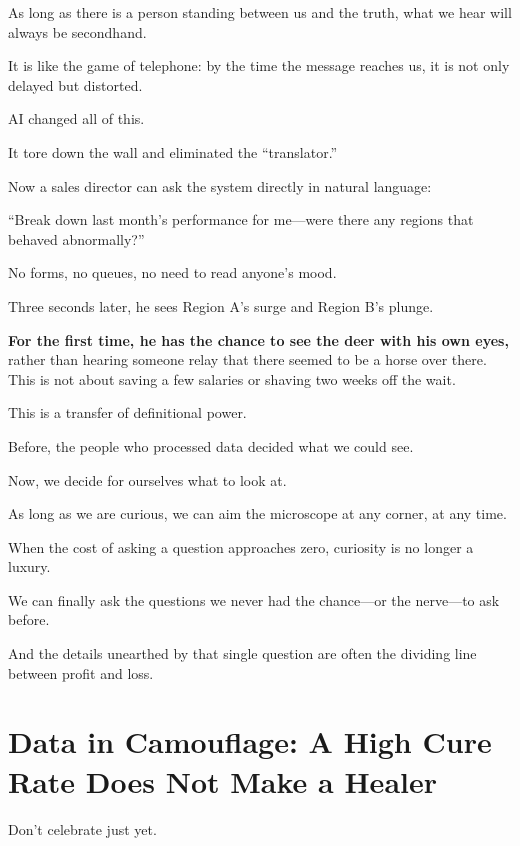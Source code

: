 As long as there is a person standing between us and the truth, what we hear will always be secondhand.

It is like the game of telephone: by the time the message reaches us, it is not only delayed but distorted.

\vspace{1em}

AI changed all of this.

It tore down the wall and eliminated the ``translator.''

Now a sales director can ask the system directly in natural language:

``Break down last month's performance for me---were there any regions that behaved abnormally?''

No forms, no queues, no need to read anyone's mood.

Three seconds later, he sees Region A's surge and Region B's plunge.

\vspace{1em}

\textbf{For the first time, he has the chance to see the deer with his own eyes,} rather than hearing someone relay that there seemed to be a horse over there.
This is not about saving a few salaries or shaving two weeks off the wait.

\vspace{1em}

This is a transfer of definitional power.

Before, the people who processed data decided what we could see.

Now, we decide for ourselves what to look at.

As long as we are curious, we can aim the microscope at any corner, at any time.

When the cost of asking a question approaches zero, curiosity is no longer a luxury.

We can finally ask the questions we never had the chance---or the nerve---to ask before.

\begin{importantbox}
And the details unearthed by that single question are often the dividing line between profit and loss.
\end{importantbox}


\newpage
\section{Data in Camouflage: A High Cure Rate Does Not Make a Healer}
Don't celebrate just yet.

